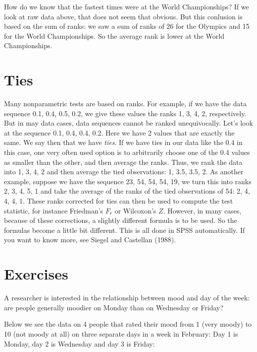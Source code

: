 \documentclass[]{report}\usepackage[]{graphicx}\usepackage[]{color}
\begin{document}
How do we know that the fastest times were at the World Championships? If we look at raw data above, that does not seem that obvious. But this conlusion is based on the sum of ranks: we saw a sum of ranks of 26 for the Olympics and 15 for the World Championships. So the average rank is lower at the World Championships.


\section{Ties}

Many nonparametric tests are based on ranks. For example, if we have the data sequence {0.1, 0.4, 0.5, 0.2}, we give these values the ranks {1, 3, 4, 2}, respectively. But in may data cases, data sequences cannot be ranked unequivocally. Let's look at the sequence {0.1, 0.4, 0.4, 0.2}. Here we have 2 values that are exactly the same. We say then that we have \textit{ties}. If we have ties in our data like the 0.4 in this case, one very often used option is to arbitrarily choose one of the 0.4 values as smaller than the other, and then average the ranks. Thus, we rank the data into {1, 3, 4, 2} and then average the tied observations: {1, 3.5, 3.5, 2}. As another example, suppose we have the sequence {23, 54, 54, 54, 19}, we turn this into ranks {2, 3, 4, 5, 1} and take the average of the ranks of the tied observations of 54: {2, 4, 4, 4, 1}. These ranks corrected for ties can then be used to compute the test statistic, for instance Friedman's $F_r$ or Wilcoxon's $Z$. However, in many cases, because of these corrections, a slightly different formula is to be used. So the formulas become a little bit different. This is all done in SPSS automatically. If you want to know more, see Siegel and Castellan (1988).




\section{Exercises}


A researcher is interested in the relationship between mood and day of the week: are people generally moodier on Monday than on Wednesday or Friday?

Below we see the data on 4 people that rated their mood from 1 (very moody) to 10 (not moody at all) on three separate days in a week in February: Day 1 is Monday, day 2 is Wednesday and day 3 is Friday:
\end{document}
